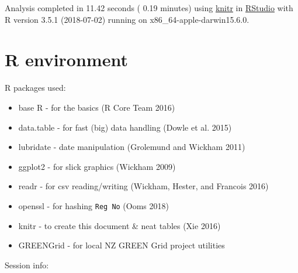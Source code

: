\documentclass[]{article}
\providecommand{\tightlist}{%
  \setlength{\itemsep}{0pt}\setlength{\parskip}{0pt}}
\begin{document}
Analysis completed in 11.42 seconds ( 0.19 minutes) using
\href{https://cran.r-project.org/package=knitr}{knitr} in
\href{http://www.rstudio.com}{RStudio} with R version 3.5.1 (2018-07-02)
running on x86\_64-apple-darwin15.6.0.

\section{R environment}\label{r-environment}

R packages used:

\begin{itemize}
\tightlist
\item
  base R - for the basics (R Core Team 2016)
\item
  data.table - for fast (big) data handling (Dowle et al. 2015)
\item
  lubridate - date manipulation (Grolemund and Wickham 2011)
\item
  ggplot2 - for slick graphics (Wickham 2009)
\item
  readr - for csv reading/writing (Wickham, Hester, and Francois 2016)
\item
  openssl - for hashing \texttt{Reg\ No} (Ooms 2018)
\item
  knitr - to create this document \& neat tables (Xie 2016)
\item
  GREENGrid - for local NZ GREEN Grid project utilities
\end{itemize}

Session info:
\end{document}
